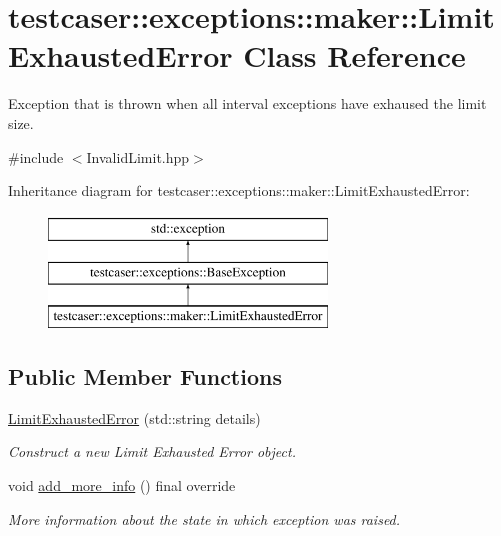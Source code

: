 \hypertarget{classtestcaser_1_1exceptions_1_1maker_1_1LimitExhaustedError}{}\section{testcaser\+:\+:exceptions\+:\+:maker\+:\+:Limit\+Exhausted\+Error Class Reference}
\label{classtestcaser_1_1exceptions_1_1maker_1_1LimitExhaustedError}


Exception that is thrown when all interval exceptions have exhaused the limit size.  




{\ttfamily \#include $<$Invalid\+Limit.\+hpp$>$}

Inheritance diagram for testcaser\+:\+:exceptions\+:\+:maker\+:\+:Limit\+Exhausted\+Error\+:\begin{figure}[H]
\begin{center}
\leavevmode
\includegraphics[height=3.000000cm]{classtestcaser_1_1exceptions_1_1maker_1_1LimitExhaustedError}
\end{center}
\end{figure}
\subsection*{Public Member Functions}
\begin{DoxyCompactItemize}
\item 
\hyperlink{classtestcaser_1_1exceptions_1_1maker_1_1LimitExhaustedError_a9ba2ad6f34755e1039132a7fa763e55f}{Limit\+Exhausted\+Error} (std\+::string details)
\begin{DoxyCompactList}\small\item\em Construct a new Limit Exhausted Error object. \end{DoxyCompactList}\item 
\mbox{\label{classtestcaser_1_1exceptions_1_1maker_1_1LimitExhaustedError_a40beeee091c1d5a35a12d6ab974c0895}} 
void \hyperlink{classtestcaser_1_1exceptions_1_1maker_1_1LimitExhaustedError_a40beeee091c1d5a35a12d6ab974c0895}{add\+\_\+more\+\_\+info} () final override
\begin{DoxyCompactList}\small\item\em More information about the state in which exception was raised. \end{DoxyCompactList}\end{DoxyCompactItemize}
